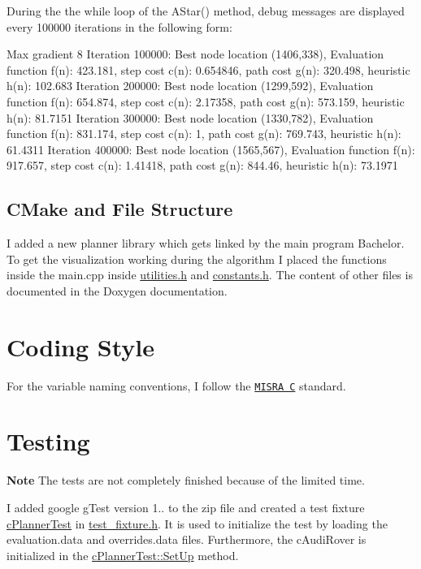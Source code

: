 During the the while loop of the A\+Star() method, debug messages are displayed every 100000 iterations in the following form\+:


\begin{DoxyCode}
Max gradient 8
Iteration 100000: Best node location (1406,338), 
     Evaluation function f(n): 423.181, step cost c(n): 0.654846, path cost g(n): 320.498, heuristic h(n):
       102.683
Iteration 200000: Best node location (1299,592), 
     Evaluation function f(n): 654.874, step cost c(n): 2.17358, path cost g(n): 573.159, heuristic h(n):
       81.7151
Iteration 300000: Best node location (1330,782), 
     Evaluation function f(n): 831.174, step cost c(n): 1, path cost g(n): 769.743, heuristic h(n): 61.4311
Iteration 400000: Best node location (1565,567), 
     Evaluation function f(n): 917.657, step cost c(n): 1.41418, path cost g(n): 844.46, heuristic h(n):
       73.1971
\end{DoxyCode}


\subsection*{C\+Make and File Structure}

I added a new planner library which gets linked by the main program Bachelor. To get the visualization working during the algorithm I placed the functions inside the main.\+cpp inside \mbox{\hyperlink{utilities_8h_source}{utilities.\+h}} and \mbox{\hyperlink{constants_8h_source}{constants.\+h}}. The content of other files is documented in the Doxygen documentation. ~\newline


\section*{Coding Style}

For the variable naming conventions, I follow the \href{https://en.wikipedia.org/wiki/MISRA_C}{\tt M\+I\+S\+RA C} standard.

\section*{Testing}

{\bfseries Note} The tests are not completely finished because of the limited time.

I added google g\+Test version 1.. to the zip file and created a test fixture \mbox{\hyperlink{classc_planner_test}{c\+Planner\+Test}} in \mbox{\hyperlink{test__fixture_8h_source}{test\+\_\+fixture.\+h}}. It is used to initialize the test by loading the evaluation.\+data and overrides.\+data files. Furthermore, the c\+Audi\+Rover is initialized in the \mbox{\hyperlink{classc_planner_test_a88ad8b0e63c66a9d94c7606aa67ef20d}{c\+Planner\+Test\+::\+Set\+Up}} method.

